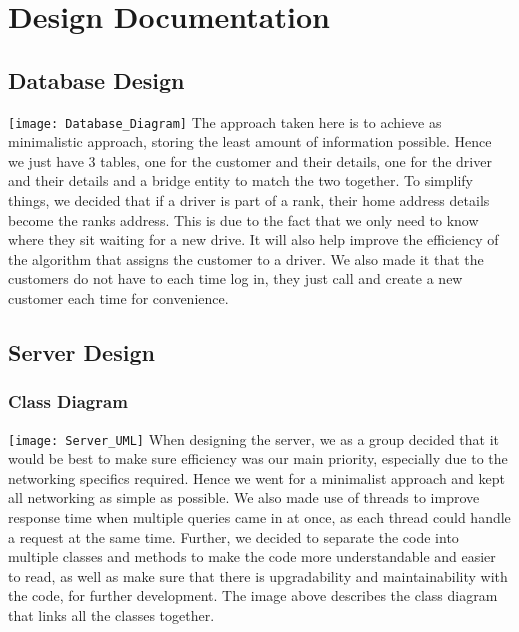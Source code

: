 \documentclass[a4paper,12pt]{article}
\begin{document}
\section{Design Documentation}
\subsection{Database Design}
\texttt{[image: Database\_Diagram]}
The approach taken here is to achieve as minimalistic approach, storing the least amount of information possible. Hence we just have 3 tables, one for the customer and their details, one for the driver and their details and a bridge entity to match the two together. To simplify things, we decided that if a driver is part of a rank, their home address details become the ranks address. This is due to the fact that we only need to know where they sit waiting for a new drive. It will also help improve the efficiency of the algorithm that assigns the customer to a driver. We also made it that the customers do not have to each time log in, they just call and create a new customer each time for convenience.

\subsection{Server Design}
\subsubsection{Class Diagram}
\texttt{[image: Server\_UML]}
When designing the server, we as a group decided that it would be best to make sure efficiency was our main priority, especially due to the networking specifics required. Hence we went for a minimalist approach and kept all networking as simple as possible. We also made use of threads to improve response time when multiple queries came in at once, as each thread could handle a request at the same time. Further, we decided to separate the code into multiple classes and methods to make the code more understandable and easier to read, as well as make sure that there is upgradability and maintainability with the code, for further development. The image above describes the class diagram that links all the classes together.
\newpage
\end{document}
